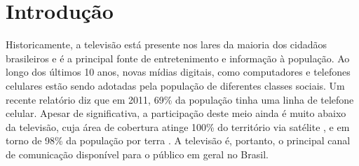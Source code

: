 \documentclass[
	12pt,				%
	oneside,			%
	a4paper,			%
	brazil
	]{abntex2}
\begin{document}
\frenchspacing 


\imprimircapa

\imprimirfolhaderosto*

\tableofcontents*
\cleardoublepage

\textual

\chapter[Introdução]{Introdução}

Historicamente, a televisão está presente nos lares da maioria dos cidadãos brasileiros e é a principal fonte de entretenimento e informação à população. Ao longo dos últimos 10 anos, novas mídias digitais, como computadores e telefones celulares estão sendo adotadas pela população de diferentes classes sociais. Um recente relatório \cite{pnad2011} diz que em 2011, 69\% da população tinha uma linha de telefone celular. Apesar de significativa, a participação deste meio ainda é muito abaixo da televisão, cuja área de cobertura atinge 100\% do território via satélite \cite{StarOne}, e em torno de 98\% da população por terra \cite{globo}. A televisão é, portanto, o principal canal de comunicação disponível para o público em geral no Brasil.

\end{document}
